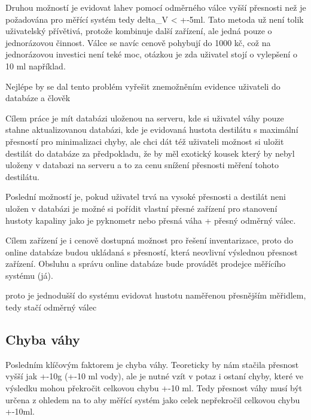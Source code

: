 Druhou možností je evidovat lahev pomocí odměrného válce vyšší přesnosti než je požadována pro měřící systém tedy delta\_V < +-5ml. Tato metoda už není tolik uživatelský přívětivá, protože kombinuje další zařízení, ale jedná pouze o jednorázovou činnost. Válce se navíc cenově pohybují do 1000 kč, což na jednorázovou investici není teké moc, otázkou je zda uživatel stojí o vylepšení o 10 ml například.

Nejlépe by se dal tento problém vyřešit znemožněním evidence uživateli do databáze a člověk

Cílem práce je mít databázi uloženou na serveru, kde si uživatel váhy pouze stahne aktualizovanou databázi, kde je evidovaná hustota destilátu s maximální přesností pro minimalizaci chyby, ale chci dát též uživateli možnost si uložit destilát do databáze za předpokladu, že by měl exotický kousek který by nebyl uloženy v databazi na serveru a to za cenu snížení přesnosti měření tohoto destilátu. 

Poslední možností je, pokud uživatel trvá na vysoké přesnosti a destilát neni uložen v databázi je možné si pořídit vlastní přesné zařízení pro stanovení hustoty kapaliny jako je pyknometr nebo přesná váha + přesný odměrný válec.

Cílem zařízení je i cenově dostupná možnost pro řešení inventarizace, proto do online databáze budou ukládaná s přesností, která neovlivní výslednou přesnost zařízení. Obsluhu a správu online databáze bude provádět prodejce měřícího systému (já).

proto je jednodušší do systému evidovat hustotu naměřenou přesnějším měřidlem, tedy stačí odměrný válec




\subsection{Chyba váhy}
Posledním klíčovým faktorem je chyba váhy. Teoreticky by nám stačila přesnost vyšší jak +-10g (+-10 ml vody), ale je nutné vzít v potaz i ostaní chyby, které ve výsledku mohou překročit celkovou chybu +-10 ml. Tedy přesnost váhy musí být určena z ohledem na to aby měřící systém jako celek nepřekročil celkovou chybu +-10ml.

